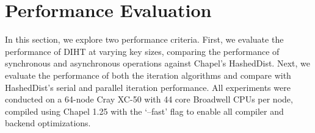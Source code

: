 \documentclass[letterpaper, 10 pt, conference]{ieeeconf}  %
\begin{document}
\section{Performance Evaluation}


In this section, we explore two performance criteria. First, we evaluate the performance of DIHT at varying key sizes, comparing the performance of synchronous and asynchronous operations against Chapel's HashedDist. Next, we evaluate the performance of both the iteration algorithms and compare with HashedDist's serial and parallel iteration performance. All experiments were conducted on a 64-node Cray XC-50 with 44 core Broadwell CPUs per node, compiled using Chapel 1.25 with the `--fast' flag to enable all compiler and backend optimizations. 
\end{document}
